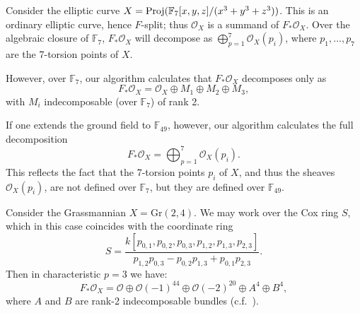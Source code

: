 \documentclass{article}
\def\O{\mathcal O}
\numberwithin{equation}{section}
\theoremstyle{theorem}
\numberwithin{thm}{section}
\theoremstyle{definition}
\begin{document}
\begin{exa}\label{algclos}
  Consider the elliptic curve $X=\operatorname{Proj} (\mathbb F_7[x,y,z]/(x^3+y^3+z^3))$.
  This is an ordinary elliptic curve, hence $F$-split; thus $\O_X$ is a summand of $F_* \O_X$. Over the algebraic closure of $\mathbb F_7$, $F_*\O_X$ will decompose as $\bigoplus_{p=1}^7 \O_X(p_i)$, where $p_1,\dots,p_7$ are the 7-torsion points of $X$.

  However, over $\mathbb F_7$, our algorithm calculates that $F_*\O_X$ decomposes only as 
  $$ F_* \O_X =\O_X \oplus M_1\oplus M_2\oplus M_3, $$
  with $M_i$ indecomposable (over $\mathbb F_7$) of rank 2.

  If one extends the ground field to $\mathbb F_{49}$, however, our algorithm calculates the full decomposition 
  $$ F_* \O_X=\bigoplus_{p=1}^7 \O_X(p_i). $$
  This reflects the fact that the 7-torsion points $p_i$ of $X$, and thus the sheaves $\O_X(p_i)$, are not defined over $\mathbb F_7$, but they are defined over $\mathbb F_{49}$.
\end{exa}

\begin{exa}
  Consider the Grassmannian $X = \mathrm{Gr(2,4)}$. We may work over the Cox ring $S$,
  which in this case coincides with the coordinate ring
  \[ S = \frac{k[p_{0,1},p_{0,2},p_{0,3},p_{1,2},p_{1,3},p_{2,3}]}{p_{1,2}p_{0,3}-p_{0,2}p_{1,3}+p_{0,1}p_{2,3}}. \]
  Then in characteristic $p=3$ we have:
  \[ F_*\O_X = \O \oplus \O(-1)^{44} \oplus \O(-2)^{20} \oplus A^4 \oplus B^4, \]
  where $A$ and $B$ are rank-2 indecomposable bundles (c.f.~\cite{RSB22}).
\end{exa}
\end{document}
